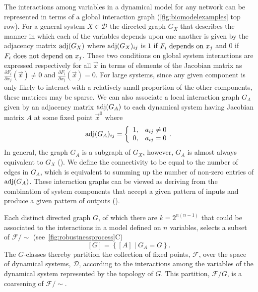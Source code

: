 The interactions among variables in a dynamical model for any network can be represented in terms of a global interaction graph (\ref{fig:biomodelexamples} top row).
For a general system $X \in \mathcal{D}$ the directed graph $G_X$ that describes the manner in which each of the variables depends upon one another is given by the adjacency matrix $\mathrm{adj}(G_X)$ where $\mathrm{adj}(G_X)_{ij}$ is $1$ if $F_i \hbox{ depends on } x_j$ and $0$ if $F_i \hbox{ does not depend on } x_j$. These two conditions on global system interactions are expressed respectively for all $\vec{x}$ in terms of elements of the Jacobian matrix as $\frac{\partial F_i}{\partial x_j}(\vec{x}) \neq 0$ and $\frac{\partial F_i}{\partial x_j}(\vec{x}) = 0$.
For large systems, since any given component is only likely to interact with a relatively small proportion of the other components, these matrices may be sparse.
We can also associate a local interaction graph $G_A$ given by an adjacency matrix $\mathrm{adj}(G_A)$ to each dynamical system having Jacobian matrix $A$ at some fixed point $\vec{x}^0$ where
 \begin{equation}\label{eq:lininterdepadj}
   \mathrm{adj}(G_A)_{ij} = \left\{
     \begin{array}{lr}
       1, & a_{ij} \neq 0\\
       0, & a_{ij} = 0
     \end{array}.
   \right.
\end{equation}
In general, the graph $G_A$ is a subgraph of $G_X$, however, $G_A$ is almost always equivalent to $G_X$ (). We define the connectivity to be equal to the number of edges in $G_A$, which is equivalent to summing up the number of non-zero entries of $\mathrm{adj}(G_A)$.
These interaction graphs can be viewed as deriving from the combination of system components that accept a given pattern of inputs and produce a given pattern of outputs ().

Each distinct directed graph $G$, of which there are $k=2^{n(n-1)}$ that could be associated to the interactions in a model defined on $n$ variables, selects a subset of $\mathcal{F} / {\sim}$ (see~\ref{fig:robustnessprocess}C)
\begin{equation}\label{eq:jacgrapheqs}
[G] = \left\{ [A] \; | \; G_A = G \right\}.
\end{equation}
The $G$-classes thereby partition the collection of fixed points, $\mathcal{F}$, over the space of dynamical systems, $\mathcal{D}$, according to the interactions among the variables of the dynamical system represented by the topology of $G$. This partition, $\mathcal{F} / G$, is a coarsening of $\mathcal{F} / {\sim}$.

